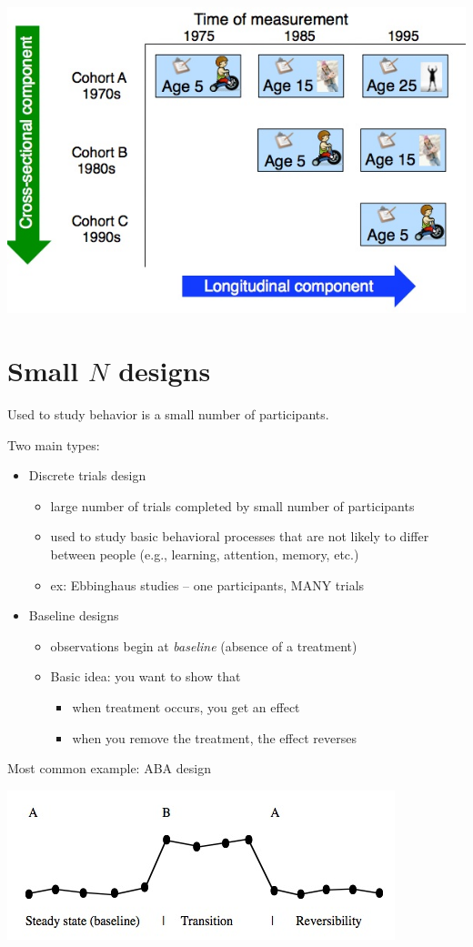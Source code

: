\documentclass[11pt]{article}
\begin{document}
\includegraphics[width=.9\linewidth]{figures/seq.jpg}

\section*{Small $N$ designs}
\label{sec-2}

Used to study behavior is a small number of participants.

Two main types:
\begin{itemize}
\item Discrete trials design
\begin{itemize}
\item large number of trials completed by small number of participants
\item used to study basic behavioral processes that are not likely to differ between people (e.g., learning, attention, memory, etc.)
\item ex: Ebbinghaus studies -- one participants, MANY trials
\end{itemize}

\item Baseline designs
\begin{itemize}
\item observations begin at \emph{baseline} (absence of a treatment)
\item Basic idea: you want to show that
\begin{itemize}
\item when treatment occurs, you get an effect
\item when you remove the treatment, the effect reverses
\end{itemize}
\end{itemize}
\end{itemize}

Most common example: ABA design

\includegraphics[width=.9\linewidth]{figures/aba.jpg}
\end{document}
